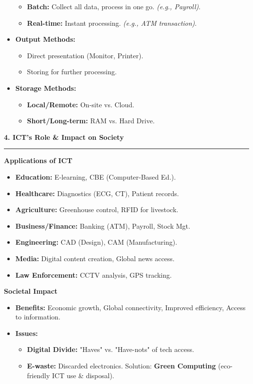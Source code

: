 \documentclass[a4paper, 8pt]{extarticle}
\newcommand{\sectionheading}[1]{\large\textbf{#1}\par\noindent\rule{\linewidth}{0.4pt}}
\newcommand{\subsectionheading}[1]{\normalsize\textbf{#1}}
\begin{document}
\begin{multicols}{2}
\begin{itemize}
        \begin{itemize}
            \item \textbf{Batch:} Collect all data, process in one go. \textit{(e.g., Payroll)}.
            \item \textbf{Real-time:} Instant processing. \textit{(e.g., ATM transaction)}.
        \end{itemize}
    \item \textbf{Output Methods:}
        \begin{itemize}
            \item Direct presentation (Monitor, Printer).
            \item Storing for further processing.
        \end{itemize}
    \item \textbf{Storage Methods:}
        \begin{itemize}
            \item \textbf{Local/Remote:} On-site vs. Cloud.
            \item \textbf{Short/Long-term:} RAM vs. Hard Drive.
        \end{itemize}
\end{itemize}

\vspace{1em}
\sectionheading{4. ICT's Role \& Impact on Society}
\vspace{0.5em}
\subsectionheading{Applications of ICT}
\begin{itemize}
    \item \textbf{Education:} E-learning, CBE (Computer-Based Ed.).
    \item \textbf{Healthcare:} Diagnostics (ECG, CT), Patient records.
    \item \textbf{Agriculture:} Greenhouse control, RFID for livestock.
    \item \textbf{Business/Finance:} Banking (ATM), Payroll, Stock Mgt.
    \item \textbf{Engineering:} CAD (Design), CAM (Manufacturing).
    \item \textbf{Media:} Digital content creation, Global news access.
    \item \textbf{Law Enforcement:} CCTV analysis, GPS tracking.
\end{itemize}

\subsectionheading{Societal Impact}
\begin{itemize}
    \item \textbf{Benefits:} Economic growth, Global connectivity, Improved efficiency, Access to information.
    \item \textbf{Issues:}
        \begin{itemize}
            \item \textbf{Digital Divide:} "Haves" vs. "Have-nots" of tech access.
            \item \textbf{E-waste:} Discarded electronics. Solution: \textbf{Green Computing} (eco-friendly ICT use \& disposal).
        \end{itemize}
\end{itemize}


\end{multicols}
\end{document}
